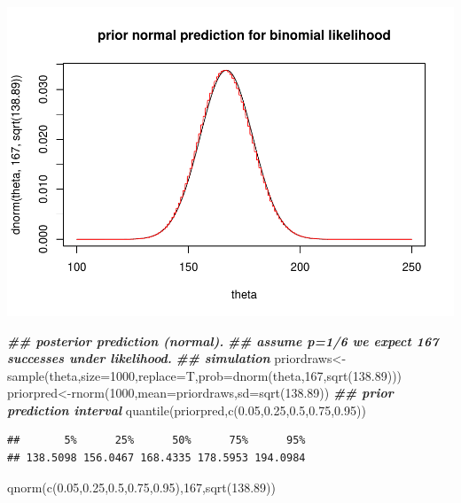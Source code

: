 \documentclass[
]{book}
\newenvironment{Shaded}{\begin{snugshade}}{\end{snugshade}}
\newcommand{\AttributeTok}[1]{\textcolor[rgb]{0.77,0.63,0.00}{#1}}
\newcommand{\DecValTok}[1]{\textcolor[rgb]{0.00,0.00,0.81}{#1}}
\newcommand{\DocumentationTok}[1]{\textcolor[rgb]{0.56,0.35,0.01}{\textbf{\textit{#1}}}}
\newcommand{\FloatTok}[1]{\textcolor[rgb]{0.00,0.00,0.81}{#1}}
\newcommand{\FunctionTok}[1]{\textcolor[rgb]{0.00,0.00,0.00}{#1}}
\newcommand{\NormalTok}[1]{#1}
\newcommand{\OtherTok}[1]{\textcolor[rgb]{0.56,0.35,0.01}{#1}}
\theoremstyle{definition}
\theoremstyle{definition}
\theoremstyle{definition}
\theoremstyle{definition}
\theoremstyle{remark}
\begin{document}
\includegraphics{_main_files/figure-latex/unnamed-chunk-13-1.pdf}

\begin{Shaded}
\begin{Highlighting}[]
  \DocumentationTok{\#\# posterior prediction (normal).}
     \DocumentationTok{\#\# assume p=1/6 we expect 167 successes under likelihood.}
\DocumentationTok{\#\# simulation     }
\NormalTok{     priordraws}\OtherTok{\textless{}{-}}\FunctionTok{sample}\NormalTok{(theta,}\AttributeTok{size=}\DecValTok{1000}\NormalTok{,}\AttributeTok{replace=}\NormalTok{T,}\AttributeTok{prob=}\FunctionTok{dnorm}\NormalTok{(theta,}\DecValTok{167}\NormalTok{,}\FunctionTok{sqrt}\NormalTok{(}\FloatTok{138.89}\NormalTok{)))}
\NormalTok{     priorpred}\OtherTok{\textless{}{-}}\FunctionTok{rnorm}\NormalTok{(}\DecValTok{1000}\NormalTok{,}\AttributeTok{mean=}\NormalTok{priordraws,}\AttributeTok{sd=}\FunctionTok{sqrt}\NormalTok{(}\FloatTok{138.89}\NormalTok{))}
     \DocumentationTok{\#\# prior prediction interval}
     \FunctionTok{quantile}\NormalTok{(priorpred,}\FunctionTok{c}\NormalTok{(}\FloatTok{0.05}\NormalTok{,}\FloatTok{0.25}\NormalTok{,}\FloatTok{0.5}\NormalTok{,}\FloatTok{0.75}\NormalTok{,}\FloatTok{0.95}\NormalTok{))}
\end{Highlighting}
\end{Shaded}

\begin{verbatim}
##       5%      25%      50%      75%      95% 
## 138.5098 156.0467 168.4335 178.5953 194.0984
\end{verbatim}

\begin{Shaded}
\begin{Highlighting}[]
     \FunctionTok{qnorm}\NormalTok{(}\FunctionTok{c}\NormalTok{(}\FloatTok{0.05}\NormalTok{,}\FloatTok{0.25}\NormalTok{,}\FloatTok{0.5}\NormalTok{,}\FloatTok{0.75}\NormalTok{,}\FloatTok{0.95}\NormalTok{),}\DecValTok{167}\NormalTok{,}\FunctionTok{sqrt}\NormalTok{(}\FloatTok{138.89}\NormalTok{))}
\end{Highlighting}
\end{Shaded}
\end{document}
